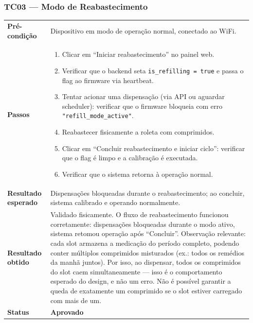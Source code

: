 \documentclass[12pt,a4paper]{article}
\newcommand{\lightrule}{\arrayrulecolor{gray!35}\midrule\arrayrulecolor{black}}
\newcommand{\aprovado}{\textcolor{green!60!black}{\textbf{Aprovado}}}
\begin{document}
\subsubsection{TC03 — Modo de Reabastecimento}
\begin{table}[H]\small\setlength{\tabcolsep}{6pt}\renewcommand{\arraystretch}{1.3}
\begin{tabularx}{\textwidth}{>{\bfseries}p{4cm} X}
\toprule
Pré-condição & Dispositivo em modo de operação normal, conectado ao WiFi. \\
\lightrule
Passos &
\begin{enumerate}[nosep,leftmargin=*]
  \item Clicar em ``Iniciar reabastecimento'' no painel web.
  \item Verificar que o backend seta \texttt{is\_refilling = true} e passa o flag ao firmware via heartbeat.
  \item Tentar acionar uma dispensação (via API ou aguardar scheduler): verificar que o firmware bloqueia com erro \texttt{"refill\_mode\_active"}.
  \item Reabastecer fisicamente a roleta com comprimidos.
  \item Clicar em ``Concluir reabastecimento e iniciar ciclo'': verificar que o flag é limpo e a calibração é executada.
  \item Verificar que o sistema retorna à operação normal.
\end{enumerate} \\
\lightrule
Resultado esperado & Dispensações bloqueadas durante o reabastecimento; ao concluir, sistema calibrado e operando normalmente. \\
\lightrule
Resultado obtido & Validado fisicamente. O fluxo de reabastecimento funcionou corretamente: dispensações bloqueadas durante o modo ativo, sistema retomou operação após ``Concluir''. Observação relevante: cada slot armazena a medicação do período completo, podendo conter múltiplos comprimidos misturados (ex.: todos os remédios da manhã juntos). Por isso, ao dispensar, todos os comprimidos do slot caem simultaneamente — isso é o comportamento esperado do design, e não um erro. Não é possível garantir a queda de exatamente um comprimido se o slot estiver carregado com mais de um. \\
\lightrule
Status & \aprovado \\
\bottomrule
\end{tabularx}\end{table}
\end{document}
